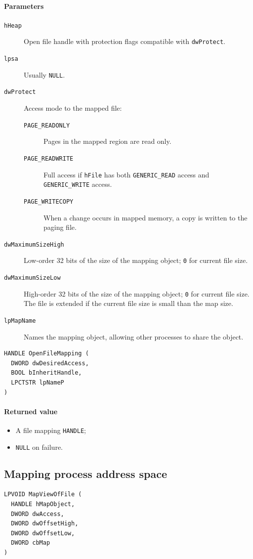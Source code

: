 \paragraph{Parameters}
\begin{description}
\item [\texttt{hHeap}] Open file handle with protection flags compatible with \texttt{dwProtect}.
\item [\texttt{lpsa}] Usually \texttt{NULL}.
\item [\texttt{dwProtect}] Access mode to the mapped file:
\begin{description}
\item [\texttt{PAGE\_READONLY}] Pages in the mapped region are read only.
\item [\texttt{PAGE\_READWRITE}] Full access if \texttt{hFile} has both \texttt{GENERIC\_READ} access and \texttt{GENERIC\_WRITE} access.
\item [\texttt{PAGE\_WRITECOPY}] When a change occurs in mapped memory, a copy is written to the paging file.
\end{description}
\item [\texttt{dwMaximumSizeHigh}] Low-order 32 bits of the size of the mapping object; \texttt{0} for current file size.
\item [\texttt{dwMaximumSizeLow}] High-order 32 bits of the size of the mapping object; \texttt{0} for current file size. The file is extended if the current file size is small than the map size.
\item [\texttt{lpMapName}] Names the mapping object, allowing other processes to share the object.
\end{description}

\begin{verbatim}
HANDLE OpenFileMapping (
  DWORD dwDesiredAccess,
  BOOL bInheritHandle,
  LPCTSTR lpNameP
)
\end{verbatim}

\paragraph{Returned value}
\begin{itemize}
\item A file mapping \texttt{HANDLE};
\item \texttt{NULL} on failure.
\end{itemize}

\subsection{Mapping process address space}
\begin{verbatim}
LPVOID MapViewOfFile (
  HANDLE hMapObject,
  DWORD dwAccess,
  DWORD dwOffsetHigh,
  DWORD dwOffsetLow,
  DWORD cbMap
)
\end{verbatim}

